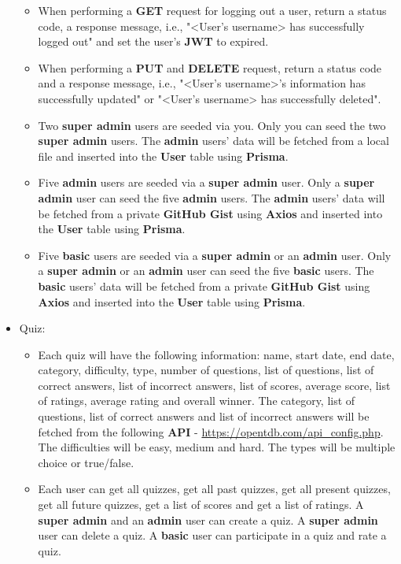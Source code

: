 \documentclass{article}
\begin{document}
\begin{itemize}
\begin{itemize}
		\item When performing a \textbf{GET} request for logging out a user, return a status code, a response message, i.e., "<User's username> has successfully logged out" and set the user's \textbf{JWT} to expired.
		\item When performing a \textbf{PUT} and \textbf{DELETE} request, return a status code and a response message, i.e., "<User's username>'s information has successfully updated" or "<User's username> has successfully deleted".
		\item Two \textbf{super admin} users are seeded via you. Only you can seed the two \textbf{super admin} users. The \textbf{admin} users' data will be fetched from a local file and inserted into the \textbf{User} table using \textbf{Prisma}. 
		\item Five \textbf{admin} users are seeded via a \textbf{super admin} user. Only a \textbf{super admin} user can seed the five \textbf{admin} users. The \textbf{admin} users' data will be fetched from a private \textbf{GitHub Gist} using \textbf{Axios} and inserted into the \textbf{User} table using \textbf{Prisma}.  
		\item Five \textbf{basic} users are seeded via a \textbf{super admin} or an \textbf{admin} user. Only a \textbf{super admin} or an \textbf{admin} user can seed the five \textbf{basic} users. The \textbf{basic} users' data will be fetched from a private \textbf{GitHub Gist} using \textbf{Axios} and inserted into the \textbf{User} table using \textbf{Prisma}. 
	\end{itemize} 
	\item Quiz:
	\begin{itemize}
		\item Each quiz will have the following information: name, start date, end date, category, difficulty, type, number of questions, list of questions, list of correct answers, list of incorrect answers, list of scores, average score, list of ratings, average rating and overall winner. The category, list of questions, list of correct answers and list of incorrect answers will be fetched from the following \textbf{API} - \href{https://opentdb.com/api\_config.php}{https://opentdb.com/api\_config.php}. The difficulties will be easy, medium and hard. The types will be multiple choice or true/false.
		\item Each user can get all quizzes, get all past quizzes, get all present quizzes, get all future quizzes, get a list of scores and get a list of ratings. A \textbf{super admin} and an \textbf{admin} user can create a quiz. A \textbf{super admin} user can delete a quiz. A \textbf{basic} user can participate in a quiz and rate a quiz.

\end{itemize}
\end{itemize}
\end{document}
